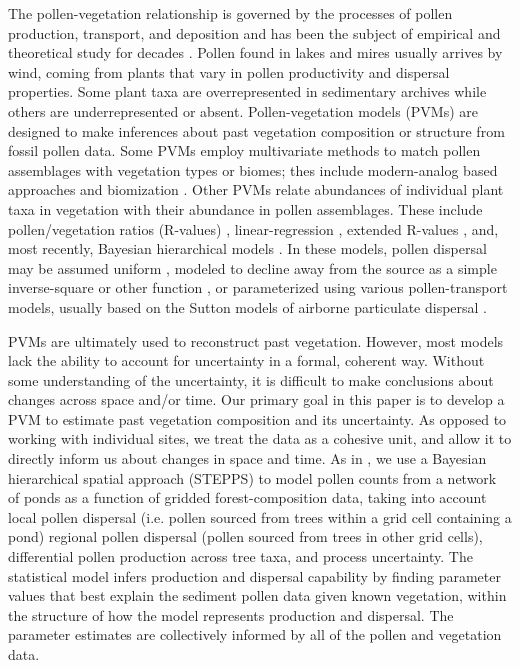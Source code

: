 \documentclass[12pt]{article}
\begin{document}
The pollen-vegetation relationship is governed by the processes of
pollen production, transport, and deposition and has been the subject
of empirical and theoretical study for decades \citep{davis1963theory,
  tauber1965, jacobson1981selection, jackson1994pollen,
  jackson1999pollen, sugita2007theory1, sugita2007theory2,
  prentice1988records}. Pollen found in lakes and mires usually
arrives by wind, coming from plants that vary in pollen productivity
and dispersal properties. Some plant taxa are overrepresented in
sedimentary archives while others are underrepresented or absent.
Pollen-vegetation models (PVMs) are designed to make inferences about
past vegetation composition or structure from fossil pollen data.
Some PVMs employ multivariate methods to match pollen assemblages with
vegetation types or biomes; thes include modern-analog based
approaches \citep{overpeck1985quantitative, williams2003variations}
and biomization \citep{prentice1996reconstructing,
  williams1998applying}. Other PVMs relate abundances of individual
plant taxa in vegetation with their abundance in pollen assemblages.
These include pollen/vegetation ratios (R-values)
\citep{curtis1959vegetation, davis1963theory}, linear-regression
\citep{webb1981estimating, bradshaw1985relationships}, extended
R-values \citep{parsons1981statistical, sugita1994pollen,
  sugita2007theory1, sugita2007theory2}, and, most recently, Bayesian
hierarchical models \citep{paciorek2009mapping, garreta2010method}.
In these models, pollen dispersal may be assumed uniform
\citep{davis1963theory, parsons1981statistical}, modeled to decline
away from the source as a simple inverse-square or other function
\citep{webb1981estimating, calcote1995pollen,
  jackson1998quantitative}, or parameterized using various
pollen-transport models, usually based on the Sutton models of
airborne particulate dispersal \citep{prentice1985pollen,
  prentice1988records, jackson1999pollen, sugita2007theory1,
  sugita2007theory2}.

PVMs are ultimately used to reconstruct past vegetation. However, most
models lack the ability to account for uncertainty in a formal,
coherent way. Without some understanding of the uncertainty, it is
difficult to make conclusions about changes across space and/or
time. Our primary goal in this paper is to develop a PVM to estimate
past vegetation composition and its uncertainty. As opposed to working
with individual sites, we treat the data as a cohesive unit, and allow
it to directly inform us about changes in space and time. As in
\citet{paciorek2009mapping}, we use a Bayesian hierarchical spatial
approach (STEPPS) to model pollen counts from a network of ponds as a
function of gridded forest-composition data, taking into account local
pollen dispersal (i.e. pollen sourced from trees within a grid cell
containing a pond) regional pollen dispersal (pollen sourced from
trees in other grid cells), differential pollen production across tree
taxa, and process uncertainty. The statistical model infers production
and dispersal capability by finding parameter values that best
explain the sediment pollen data given known vegetation, within the
structure of how the model represents production and dispersal. The
parameter estimates are collectively informed by all of the pollen and
vegetation data.
\end{document}

